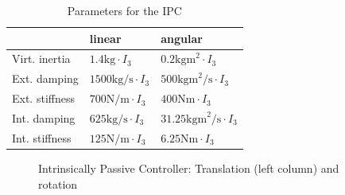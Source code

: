 \documentclass[a4paper,twoside, openright,12pt]{report}
\begin{document}
\begin{table}
	\centering
	\caption[Parameters for the IPC]{Parameters for the IPC}\vspace{10pt}
	\label{TAB:IPCParameters}
	
	\begin{tabular}{ l | l | l }
	 & linear & angular \\ \hline
	Virt. inertia & $1.4 \text{kg} \cdot I_3$ & $0.2 \text{kgm}^2 \cdot I_3$ \\ \hline
	Ext. damping	 & $1500 \text{kg/s} \cdot I_3$ & $500 \text{kgm}^2 \text{/s} \cdot I_3$ \\ \hline
	Ext. stiffness & $700 \text{N/m} \cdot I_3$ & $400 \text{Nm} \cdot  I_3$ \\ \hline
	Int. damping & $625 \text{kg/s} \cdot I_3$ & $31.25 \text{kgm}^2 \text{/s} \cdot I_3 $ \\ \hline
	Int. stiffness & $125 \text{N/m} \cdot I_3$ & $6.25 \text{Nm} \cdot I_3$\\ \hline
\end{tabular}
\end{table}




%


\begin{figure}

\label{FIG:IPCSim}
\caption[Simulation results: Intrinsically Passive Controller]{Intrinsically Passive Controller: Translation (left column) and rotation}
\end{figure}


\clearpage
\end{document}
